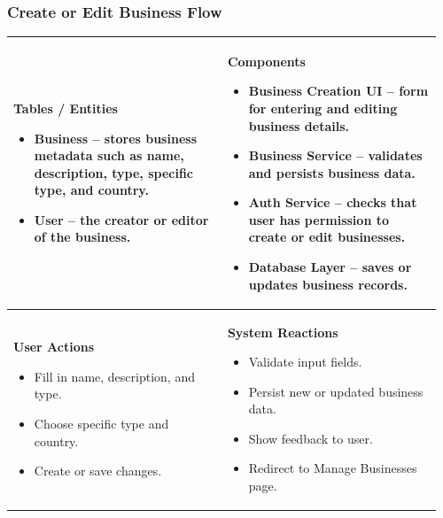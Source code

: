 \documentclass[]{VUMIFTemplateClass}
\newenvironment{mpitemlist}[1][\linewidth]{%
    \begin{minipage}[t]{#1}%
        \setlength{\leftmargini}{12pt}%
        \begin{itemize}%
            \setlength{\itemsep}{1pt}%
            \setlength{\parskip}{0pt}%
            \setlength{\parsep}{0pt}%
}{%
        \end{itemize}%
    \end{minipage}\newline
}
\begin{document}
\subsubsection{Create or Edit Business Flow}
\begin{center}
\setlength{\tabcolsep}{8pt}
\renewcommand{\arraystretch}{1.3}
\begin{tabular}{|p{0.48\linewidth}|p{0.48\linewidth}|}
\hline
\textbf{Tables / Entities} \newline
\begin{mpitemlist}
\item \textbf{Business} – stores business metadata such as name, description, type, specific type, and country.
\item \textbf{User} – the creator or editor of the business.
\end{mpitemlist}
&
\textbf{Components} \newline
\begin{mpitemlist}
\item \textbf{Business Creation UI} – form for entering and editing business details.
\item \textbf{Business Service} – validates and persists business data.
\item \textbf{Auth Service} – checks that user has permission to create or edit businesses.
\item \textbf{Database Layer} – saves or updates business records.
\end{mpitemlist}
\\ \hline
\textbf{User Actions} \newline
\begin{mpitemlist}
\item Fill in name, description, and type.
\item Choose specific type and country.
\item Create or save changes.
\end{mpitemlist}
&
\textbf{System Reactions} \newline
\begin{mpitemlist}
\item Validate input fields.
\item Persist new or updated business data.
\item Show feedback to user.
\item Redirect to Manage Businesses page.
\end{mpitemlist}
\\ \hline
\end{tabular}
\end{center}
\end{document}
